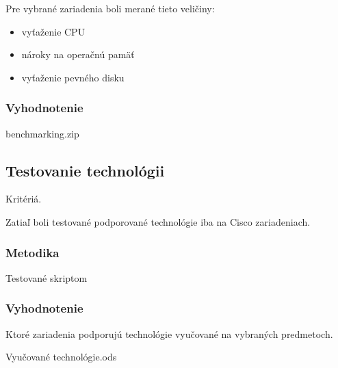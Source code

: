 Pre vybrané zariadenia boli merané tieto veličiny:
\begin{itemize}
\item vyťaženie CPU
\item nároky na operačnú pamäť
\item vyťaženie pevného disku
\end{itemize}

\subsubsection{Vyhodnotenie}

benchmarking.zip

\subsection{Testovanie technológii}
\label{chap:testovanie_technologii}

Kritériá.

Zatiaľ boli testované podporované technológie iba na Cisco zariadeniach.

\subsubsection{Metodika}

Testované skriptom

\subsubsection{Vyhodnotenie}

Ktoré zariadenia podporujú technológie vyučované na vybraných predmetoch.

Vyučované technológie.ods